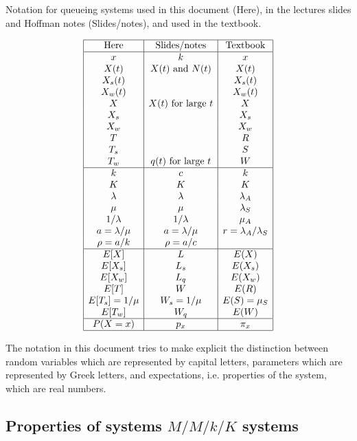 \documentclass{article}
\renewcommand{\alpha}{a} %
\begin{document}
\begin{table}[h]
\caption{Notation for queueing systems used in this document (Here), in the lectures slides and Hoffman notes (Slides/notes), and used in the textbook.}
\label{tab:notation}
\[ \begin{array}{|c|c|c|}
\hline
\mbox{Here} & \mbox{Slides/notes} & \mbox{Textbook} \\
\hline
x & k & x \\
X(t) & X(t) \mbox{ and } N(t) & X(t) \\
X_s(t) & & X_s(t) \\
X_w(t) & & X_w(t) \\
X & X(t)\mbox{ for large }t & X \\
X_s && X_s \\
X_w && X_w \\
T && R \\
T_s && S \\
T_w & q(t)\mbox{ for large }t & W \\
\hline
k & c & k \\
K & K & K \\
\lambda & \lambda & \lambda_A \\
\mu & \mu & \lambda_S \\
1/\lambda & 1/\lambda & \mu_A \\
\alpha=\lambda/\mu & a = \lambda/\mu  & r = \lambda_A/\lambda_S \\
\rho = \alpha/k & \rho=a/c & \\
\hline
E[X] & L & E(X) \\
E[X_s] & L_s & E(X_s) \\
E[X_w] & L_q & E(X_w) \\
E[T] & W & E(R) \\
E[T_s]=1/\mu & W_s=1/\mu & E(S) = \mu_S \\
E[T_w] & W_q & E(W) \\
\hline
P(X=x) & p_x & \pi_x \\
\hline
\end{array} \]
\end{table}

The notation in this document tries to make explicit the distinction between random variables which are represented by capital letters, parameters which are represented by Greek letters, and expectations, i.e. properties of the system, which are real numbers. 

\subsection{Properties of systems $M/M/k/K$ systems}
\end{document}
